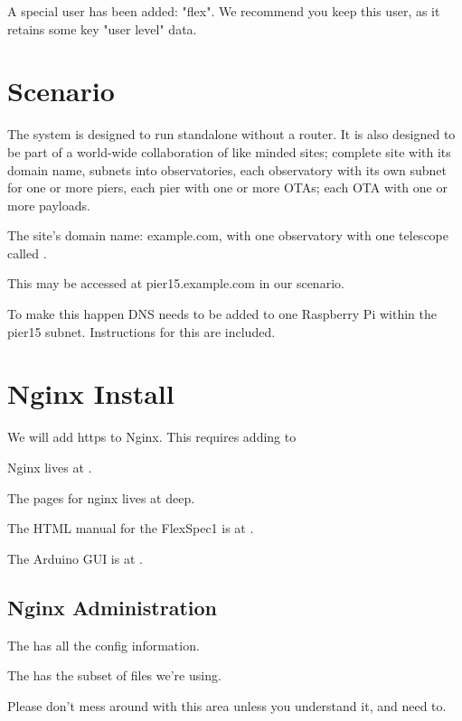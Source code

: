\documentclass[letter,11pt,oneside]{article}
\newcommand{\dhl}[1]{{\color{verbcolor}{\texttt#1}}}
\begin{document}
A special user has been added: "flex". We recommend you keep this
user, as it retains some key "user level" data.



\section{Scenario} \label{sec:Scenario}

The system is designed to run standalone without a router. It is
also designed to be part of a world-wide collaboration of like minded
sites; complete site with its domain name, subnets into observatories,
each observatory with its own subnet for one or more piers, each
pier with one or more OTAs; each OTA with one or more payloads.

The site's domain name:  example.com, with one observatory with
one telescope called \dhl{pier15}.

This  may be accessed at pier15.example.com in our scenario.

To make this happen DNS needs to be added to one Raspberry Pi within
the pier15 subnet. Instructions for this are included.

\section{Nginx Install}

We will add https to Nginx. This requires adding to \dhl{nginx.conf}

Nginx lives at \dhl{/etc/nginx}.

The pages for nginx lives at \dhl{/var/www/html} deep.

The HTML manual for the FlexSpec1 is at \dhl{http://pier15.local/flexhelp}.

The Arduino GUI is at \dhl{http://pier15.local/flexspec}. 


\subsection{Nginx Administration} \label{sec:NginxAdministration}

The \dhl{/etc/nginx/sites-available} has all the config information.

The \dhl{/etc/nginx/sites-enabled}   has the subset of files we're using.

Please don't mess around with this area unless you understand it, and need to.
\end{document}

